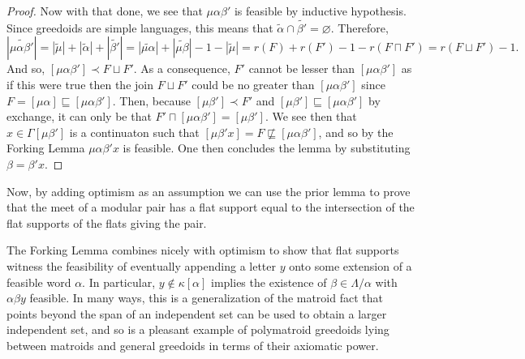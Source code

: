 \documentclass[11pt]{article}
\newcommand{\glang}{\Lambda}
\begin{document}
\begin{proof}
    Now with that done, we see that $\mu \alpha \beta'$ is feasible by inductive hypothesis.
    Since greedoids are simple languages, this means that $\widetilde{\alpha}\cap\widetilde{\beta'} = \varnothing$.
    Therefore, 
    \[
        |\widetilde{\mu\alpha\beta'}| = |\widetilde{\mu}| + |\widetilde{\alpha}| + |\widetilde{\beta'}| = |\widetilde{\mu\alpha}| + |\widetilde{\mu\beta}| - 1 - |\widetilde{\mu}| = r(F) + r(F') - 1 - r(F\sqcap F') = r(F\sqcup F') - 1.
    \]
    And so, $[\mu\alpha\beta'] \prec F\sqcup F'$.
    As a consequence, $F'$ cannot be lesser than $[\mu\alpha\beta']$ as if this were true then the join $F\sqcup F'$ could be no greater than $[\mu\alpha\beta']$ since $F = [\mu\alpha]\sqsubseteq [\mu\alpha\beta']$.
    Then, because $[\mu\beta'] \prec F'$ and $[\mu\beta'] \sqsubseteq [\mu\alpha\beta']$ by exchange, it can only be that $F' \sqcap [\mu\alpha\beta'] = [\mu\beta']$.
    We see then that $x \in \Gamma[\mu\beta']$ is a continuaton such that $[\mu\beta' x] = F \not\sqsubseteq [\mu\alpha\beta']$, and so by the Forking Lemma $\mu\alpha\beta' x$ is feasible.
    One then concludes the lemma by substituting $\beta = \beta' x$.
\end{proof}

Now, by adding optimism as an assumption we can use the prior lemma to prove that the meet of a modular pair has a flat support equal to the intersection of the flat supports of the flats giving the pair.

\fi

The Forking Lemma combines nicely with optimism to show that flat supports witness the feasibility of eventually appending a letter $y$ onto some extension of a feasible word $\alpha$.
In particular, $y\notin\kappa[\alpha]$ implies the existence of $\beta \in \glang/\alpha$ with $\alpha\beta y$ feasible.
In many ways, this is a generalization of the matroid fact that points beyond the span of an independent set can be used to obtain a larger independent set, and
so is a pleasant example of polymatroid greedoids lying between matroids and general greedoids in terms of their axiomatic power.
\end{document}
